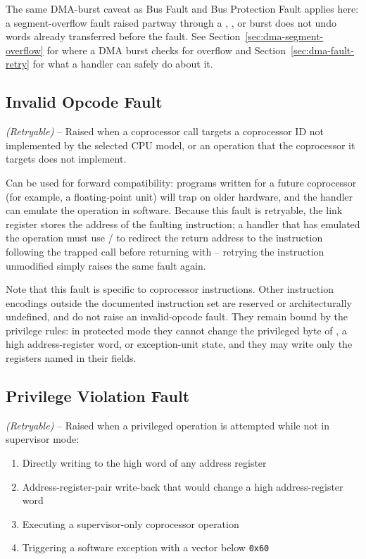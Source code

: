 The same DMA-burst caveat as Bus Fault and Bus Protection Fault applies here: a segment-overflow fault raised partway
through a , , or  burst does not undo words already transferred before the
fault. See Section~\ref{sec:dma-segment-overflow} for where a DMA burst checks for overflow and
Section~\ref{sec:dma-fault-retry} for what a handler can safely do about it.

\subsection{Invalid Opcode Fault}

\textit{(Retryable)} -- Raised when a coprocessor call targets a coprocessor
ID not implemented by the selected CPU model, or an operation that the coprocessor it targets does not implement.

Can be used for forward compatibility: programs written for a future coprocessor (for example, a floating-point unit)
will trap on older hardware, and the handler can emulate the operation in software. Because this fault is retryable,
the link register stores the address of the faulting instruction; a handler that has emulated the operation must use
/ to redirect the return address to the instruction following the trapped call before
returning with  -- retrying the instruction unmodified simply raises the same fault again.

Note that this fault is specific to coprocessor instructions. Other instruction encodings outside the documented
instruction set are reserved or architecturally undefined, and do not raise an invalid-opcode fault. They remain bound
by the privilege rules: in protected mode they cannot change the privileged byte of , a high address-register
word, or exception-unit state, and they may write only the registers named in their fields.

\subsection{Privilege Violation Fault}
\label{sec:privilege-violation-fault}

\textit{(Retryable)} -- Raised when a privileged operation is attempted
while not in supervisor mode:
\begin{enumerate}
	\item Directly writing to the high word of any address register
	\item Address-register-pair write-back that would change a high address-register word
	\item Executing a supervisor-only coprocessor operation
	\item Triggering a software exception with a vector below \texttt{0x60}
\end{enumerate}

